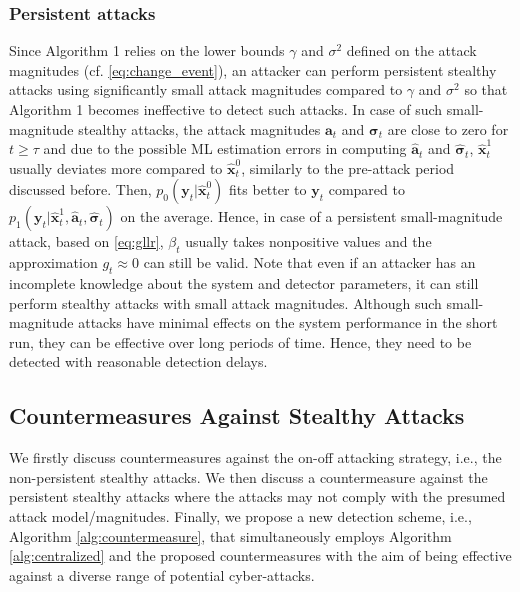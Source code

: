 \documentclass[onecolumn]{IEEEtran}
\begin{document}
\subsubsection{Persistent attacks}

Since Algorithm 1 relies on the lower bounds $\gamma$ and $\sigma^2$ defined on the attack magnitudes (cf. \eqref{eq:change_event}), an attacker can perform persistent stealthy attacks using significantly small attack magnitudes compared to $\gamma$ and $\sigma^2$ so that Algorithm 1 becomes ineffective to detect such attacks. In case of such small-magnitude stealthy attacks, the attack magnitudes ${\mathbf{a}}_t$ and ${\pmb{\sigma}}_t$ are close to zero for $t \geq \tau$ and due to the possible ML estimation errors in computing $\hat{\mathbf{a}}_t$ and $\hat{\pmb{\sigma}}_t$, $\hat{\mathbf{x}}_t^1$ usually deviates more compared to $\hat{\mathbf{x}}_t^0$, similarly to the pre-attack period discussed before. Then, $p_0(\mathbf{y}_t|\hat{\mathbf{x}}_t^0)$ fits better to $\mathbf{y}_t$ compared to $p_1(\mathbf{y}_t|\hat{\mathbf{x}}_t^1, \hat{\mathbf{a}}_t, \hat{\pmb{\sigma}}_t)$ on the average. Hence, in case of a persistent small-magnitude attack, based on \eqref{eq:gllr}, $\beta_t$ usually takes nonpositive values and the approximation $g_t \approx 0$ can still be valid. Note that even if an attacker has an incomplete knowledge about the system and detector parameters, it can still perform stealthy attacks with small attack magnitudes. Although such small-magnitude attacks have minimal effects on the system performance in the short run, they can be effective over long periods of time. Hence, they need to be detected with reasonable detection delays.


\subsection{Countermeasures Against Stealthy Attacks} \label{sec:st_counter}

We firstly discuss countermeasures against the on-off attacking strategy, i.e., the non-persistent stealthy attacks. We then discuss a countermeasure against the persistent stealthy attacks where the attacks may not comply with the presumed attack model/magnitudes. Finally, we propose a new detection scheme, i.e., Algorithm \ref{alg:countermeasure}, that simultaneously employs Algorithm \ref{alg:centralized} and the proposed countermeasures with the aim of being effective against a diverse range of potential cyber-attacks.
\end{document}
